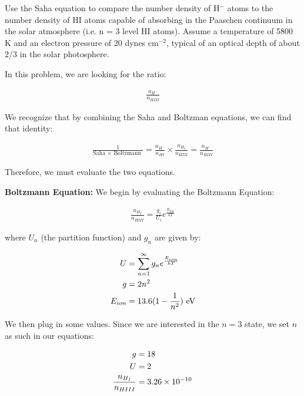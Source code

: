 \documentclass[12pt]{article}
\newenvironment{problem}[2][Problem]{\begin{trivlist}
\item[\hskip \labelsep {\bfseries #1}\hskip \labelsep {\bfseries #2.}]}{\end{trivlist}}
\newenvironment{answer}[2][Answer]{\begin{trivlist}
\item[\hskip \labelsep {\bfseries #1}\hskip \labelsep {\bfseries #2.}]}{\end{trivlist}}
\begin{document}
\begin{problem}{4}
Use the Saha equation to compare the number density of H$^-$ atoms to the number density of HI atoms capable of absorbing in the Paaschen continuum in the solar atmosphere (i.e. n = 3 level HI atoms). Assume a temperature of 5800 K and an electron pressure of 20 dynes cm$^{-2}$, typical of an optical depth of about 2/3 in the solar photosphere.
\end{problem}

\begin{answer}{4}

In this problem, we are looking for the ratio:

\begin{align}
  \frac{n_{H^-}}{n_{HIII}}
\end{align}


We recognize that by combining the Saha and Boltzman equations, we can find that identity:

\begin{align}
  \frac{1}{\text{Saha $\times$ Boltzmann }} = \frac{n_{H^-}}{n_{HI}} \times \frac{n_{H_I}}{n_{HIII}} = \frac{n_{H^-}}{n_{HIII}}
\end{align}


Therefore, we must evaluate the two equations.

\bigskip
\textbf{Boltzmann Equation: } We begin by evaluating the Boltzmann Equation:

\begin{align}
  \frac{n_{H_I}}{n_{HIII}} = \frac{g_i}{U_i} e^{\frac{E_{ion}}{kT}}
\end{align}

where $U_n$ (the partition function) and $g_n$ are given by:

\begin{align}
  U &= \sum_{n=1}^{\infty} g_n e^{\frac{E_{ion}}{kT}} \notag \\
  g &= 2n^2 \notag \\
  E_{ion} &= 13.6 (1 - \frac{1}{n^2}) \text{ eV}
\end{align}


We then plug in some values. Since we are interested in the $n = 3$ state, we set $n$ as such in our equations:

\begin{align}
  g &= 18 \notag \\
  U &= 2 \notag \\
  \frac{n_{H_I}}{n_{HIII}} &= 3.26 \times 10^{-10}
\end{align}



\end{answer}
\end{document}
